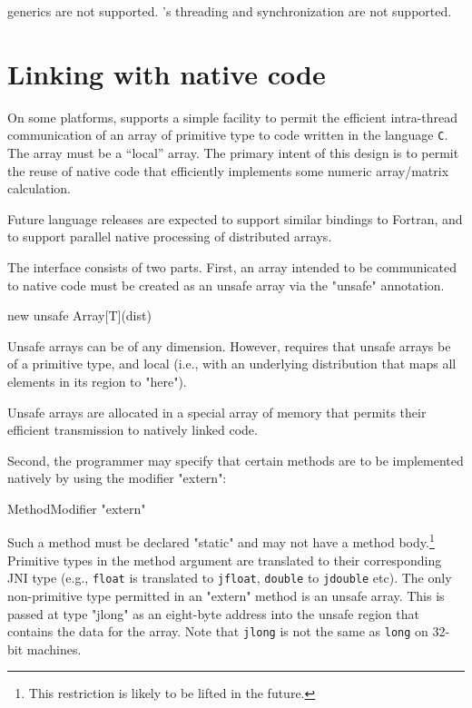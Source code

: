 \java{} generics are not supported.
\java{}'s threading and synchronization are not supported.

\chapter{Linking with native code}\label{extern}

On some platforms,
\XtenCurrVer{} supports a simple facility to permit the efficient
intra-thread communication of an array of primitive type to code
written in the language {\tt C}.  The array must be a ``local''
array. The primary intent of this design is to permit the reuse of
native code that efficiently implements some numeric array/matrix
calculation.

Future language releases are expected to support similar bindings to
{\sc Fortran}, and to support parallel native processing of
distributed \Xten{} arrays. 

The interface consists of two parts. First, an array intended to be
communicated to native code must be created as an unsafe array
via the \xcd"unsafe" annotation.
\begin{xten}
new unsafe Array[T](dist)
\end{xten}
Unsafe arrays can be of any dimension. However, \XtenCurrVer{}
requires that unsafe arrays be of a primitive type, and local
(i.e.,
with an underlying distribution that maps all elements in its region
to \xcd"here").

Unsafe arrays are allocated in a special array of memory that permits
their efficient transmission to natively linked code.

Second, the \Xten{} programmer may specify that certain methods are to
be implemented natively by using the modifier \xcd"extern":

\begin{grammar}
   MethodModifier \: \xcd"extern"
\end{grammar}

Such a method must be declared \xcd"static" and may not have a
method body.\footnote{This
restriction is likely to be lifted in the future.}  Primitive types in
the method argument are translated to their corresponding JNI type
(e.g., {\tt float} is translated to {\tt jfloat}, {\tt double} to
{\tt jdouble} etc).  The only non-primitive type permitted in an
\xcd"extern" method is an unsafe array. This is passed at type
\xcd"jlong" as an eight-byte address into the unsafe region that contains
the data for the array.  Note that {\tt jlong} is not the same as {\tt long} on
32-bit machines.


